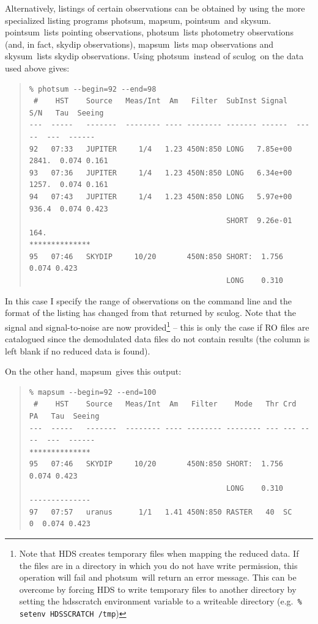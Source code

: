 \documentclass[twoside,11pt]{article}
\newcommand{\task}[1]{{\sf #1}}
\newcommand{\sculog}{\htmlref{\task{sculog}}{SCULOG}}
\newcommand{\photsum}{\htmlref{\task{photsum}}{PHOTSUM}}
\newcommand{\mapsum}{\htmlref{\task{mapsum}}{MAPSUM}}
\newcommand{\skysum}{\htmlref{\task{skysum}}{SKYSUM}}
\newcommand{\pointsum}{\htmlref{\task{pointsum}}{POINTSUM}}
\newenvironment{myquote}{\begin{quote}\begin{small}}{\end{small}\end{quote}}
\newcommand{\htmlref}[2]{#1}
\renewcommand{\_}{\texttt{\symbol{95}}}
\begin{document}
Alternatively, listings of certain observations can be obtained by using the
more specialized listing programs \photsum, \mapsum, \pointsum\ and
\skysum. \pointsum\ lists pointing observations, \photsum\ lists photometry
observations (and, in fact, skydip observations), \mapsum\ lists map
observations and \skysum\ lists skydip observations. Using
\photsum\ instead of \sculog\ on the data used above gives:
\begin{myquote}
\begin{verbatim}
% photsum --begin=92 --end=98
 #    HST    Source   Meas/Int  Am   Filter  SubInst Signal   S/N   Tau  Seeing
---  -----   -------  -------- ---- -------- ------- ------  -----  ---  ------
92   07:33   JUPITER     1/4   1.23 450N:850 LONG   7.85e+00 2841.  0.074 0.161
93   07:36   JUPITER     1/4   1.23 450N:850 LONG   6.34e+00 1257.  0.074 0.161
94   07:43   JUPITER     1/4   1.23 450N:850 LONG   5.97e+00 936.4  0.074 0.423
                                             SHORT  9.26e-01 164.
**************
95   07:46   SKYDIP     10/20       450N:850 SHORT:  1.756          0.074 0.423
                                             LONG    0.310
\end{verbatim}
\end{myquote}
In this case I specify the range of observations on the command line and
the format of the listing has changed from that returned by \sculog. Note that
the signal and signal-to-noise are now provided\footnote{Note that HDS creates
temporary files when mapping the reduced data. If the files are in a directory
in which you do not have write permission, this operation will fail and 
\photsum\ will return an error message. This can be overcome by forcing 
HDS to write temporary files to another directory by setting the 
{\sc hds\_scratch} environment variable to a writeable directory 
(e.g.\ {\tt \% setenv HDS\_SCRATCH /tmp})} -- this is only the case 
if RO files are catalogued since the demodulated data files do not
contain results (the column is left blank if no reduced data is found).

On the other hand, \mapsum\ gives this output:
\begin{myquote}
\begin{verbatim}
% mapsum --begin=92 --end=100
 #    HST    Source   Meas/Int  Am   Filter    Mode   Thr Crd  PA   Tau  Seeing
---  -----   -------  -------- ---- -------- -------- --- --- ----  ---  ------
**************
95   07:46   SKYDIP     10/20       450N:850 SHORT:  1.756          0.074 0.423
                                             LONG    0.310
--------------
97   07:57   uranus      1/1   1.41 450N:850 RASTER   40  SC     0  0.074 0.423
\end{verbatim}
\end{myquote}
\end{document}
